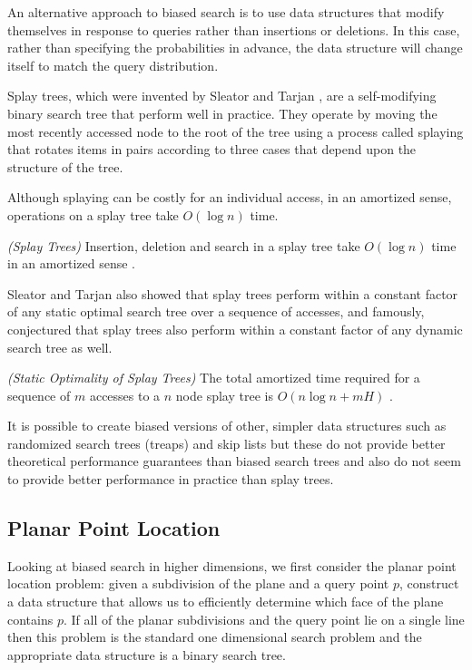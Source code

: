\documentclass[mcs]{scsthesis}
\begin{document}
An alternative approach to biased search is to use data structures that 
modify themselves in response to queries rather than insertions or deletions. In
this case, rather than specifying the probabilities in advance, the data
structure will change itself to match the query distribution. 

Splay trees, which were invented by Sleator and Tarjan \cite{splaytree}, are a
self-modifying binary search tree that perform well in practice. They operate
by moving the most recently accessed node to the root of the tree using a
process called splaying that rotates items in pairs according to three cases
that depend upon the structure of the tree.

Although splaying can be costly for an individual access, in an amortized
sense, operations on a splay tree take \(O(\log n)\) time.

\begin{thm} \emph{(Splay Trees)} 
Insertion, deletion and search in a splay tree take \(O(\log n)\) time in
an amortized sense \cite{splaytree}.
\end{thm}

Sleator and Tarjan also showed that splay trees perform within a constant
factor of any static optimal search tree over a sequence of accesses, and
famously, conjectured that splay trees also perform within a constant factor
of any dynamic search tree as well.

\begin{thm} \emph{(Static Optimality of Splay Trees)} 
The total amortized time required for a sequence of $m$ accesses to a $n$
node splay tree is \(O(n \log n + mH)\) \cite{splaytree}.
\end{thm}

It is possible to create biased versions of other, simpler data structures
such as randomized search trees (treaps) \cite{treap} and skip lists
\cite{bsl2} but these do not provide better theoretical performance guarantees
than biased search trees and also do not seem to provide better performance in
practice than splay trees.

\subsection{Planar Point Location}

Looking at biased search in higher dimensions, we first consider the planar
point location problem: given a subdivision of the plane and a query point \(p\),
construct a data structure that allows us to efficiently determine which face
of the plane contains \(p\). If all of the planar subdivisions and the query
point lie on a single line then this problem is the standard one dimensional
search problem and the appropriate data structure is a binary search tree.
\end{document}
